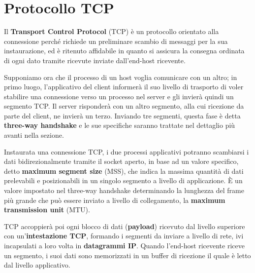 %

\section{Protocollo TCP}
Il \textbf{Transport Control Protocol} (TCP) è un protocollo orientato alla connessione perché richiede un preliminare scambio di messaggi per la sua
instaurazione, ed è ritenuto affidabile in quanto si assicura la consegna ordinata di ogni dato tramite ricevute inviate dall'end-host ricevente.\par
Supponiamo ora che il processo di un host voglia comunicare con un altro; in primo luogo, l'applicativo del client informerà il suo livello di trasporto
di voler stabilire una connessione verso un processo nel server e gli invierà quindi un segmento TCP. Il server risponderà con un altro segmento, alla
cui ricezione da parte del client, ne invierà un terzo. Inviando tre segmenti, questa fase è detta \textbf{three-way handshake} e le sue specifiche
saranno trattate nel dettaglio più avanti nella sezione.\par
Instaurata una connessione TCP, i due processi applicativi potranno scambiarsi i dati bidirezionalmente tramite il socket aperto, in base ad un valore
specifico, detto \textbf{maximum segment size} (MSS), che indica la massima quantità di dati prelevabili e posizionabili in un singolo segmento a
livello di applicazione. È un valore impostato nel three-way handshake determinando la lunghezza del frame più grande che può essere inviato a livello
di collegamento, la \textbf{maximum transmission unit} (MTU).\par
TCP accoppierà poi ogni blocco di dati (\textbf{payload}) ricevuto dal livello superiore con un'\textbf{intestazione TCP}, formando i segmenti da
inviare a livello di rete, ivi incapsulati a loro volta in \textbf{datagrammi IP}. Quando l'end-host ricevente riceve un segmento, i suoi dati sono
memorizzati in un buffer di ricezione il quale è letto dal livello applicativo.\newline

